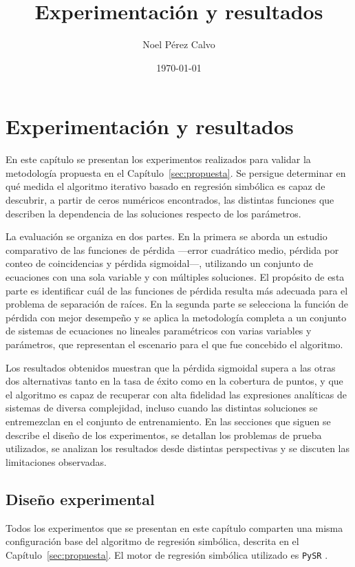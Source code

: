 \documentclass{article} \usepackage[utf8]{inputenc} \usepackage[spanish]{babel} \usepackage{amsmath, amssymb, amsthm} \usepackage{bm} \usepackage{float} \usepackage{longtable} \usepackage[hidelinks]{hyperref} \spanishdecimal{.}
\title{Experimentación y resultados} \author{Noel Pérez Calvo} \date{\today}
\begin{document}
\maketitle

\section{Experimentación y resultados} \label{sec:experimentacion}

En este capítulo se presentan los experimentos realizados para validar la metodología propuesta en el Capítulo~\ref{sec:propuesta}. Se persigue determinar en qué medida el algoritmo iterativo basado en regresión simbólica es capaz de descubrir, a partir de ceros numéricos encontrados, las distintas funciones que describen la dependencia de las soluciones respecto de los parámetros.

La evaluación se organiza en dos partes. En la primera se aborda un estudio comparativo de las funciones de pérdida —error cuadrático medio, pérdida por conteo de coincidencias y pérdida sigmoidal—, utilizando un conjunto de ecuaciones con una sola variable y con múltiples soluciones. El propósito de esta parte es identificar cuál de las funciones de pérdida resulta más adecuada para el problema de separación de raíces. En la segunda parte se selecciona la función de pérdida con mejor desempeño y se aplica la metodología completa a un conjunto de sistemas de ecuaciones no lineales paramétricos con varias variables y parámetros, que representan el escenario para el que fue concebido el algoritmo.

Los resultados obtenidos muestran que la pérdida sigmoidal supera a las otras dos alternativas tanto en la tasa de éxito como en la cobertura de puntos, y que el algoritmo es capaz de recuperar con alta fidelidad las expresiones analíticas de sistemas de diversa complejidad, incluso cuando las distintas soluciones se entremezclan en el conjunto de entrenamiento. En las secciones que siguen se describe el diseño de los experimentos, se detallan los problemas de prueba utilizados, se analizan los resultados desde distintas perspectivas y se discuten las limitaciones observadas.

\subsection{Diseño experimental} \label{sec:diseno_comun}

Todos los experimentos que se presentan en este capítulo comparten una misma configuración base del algoritmo de regresión simbólica, descrita en el Capítulo~\ref{sec:propuesta}. El motor de regresión simbólica utilizado es \texttt{PySR} \cite{cranmer2023pysr}.
\end{document}
